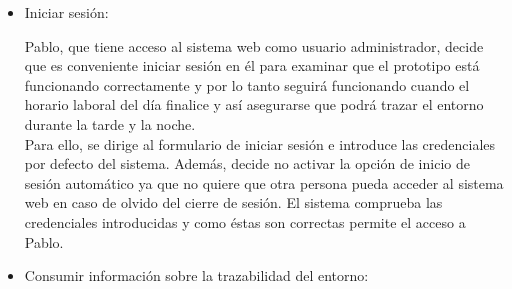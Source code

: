 \documentclass[12pt,a4paper, twoside]{report}
\begin{document}
\begin{itemize}
		Tras haber realizado la configuración inicial, Pablo prepara la localización dentro del CPD donde va a situar el sistema, decidiendo en ese momento cuáles serán los umbrales más idóneos de los eventos a partir de los cuáles los valores medidos se considerarán anómalos y activando así el protocolo de alerta. Antes de realizar la primera prueba, consulta el manual de configuración y de usuario para conocer los servicios de los que debe disponer como, por ejemplo: cuenta en el servicio de almacenamiento en la nube Dropbox, cuenta Gmail, red de negocio desplegada en la \gls{blockchain-a}, etc. \\
		
		En primer lugar, realiza la puesta en marcha y configuración de todos los servicios requeridos y obtiene las direcciones \gls{i2c-a} de los \glspl{lcd-a} las cuales introducirá como opciones en la ejecución. Posteriormente, decide ejecutar el componente de monitorización inicializando los servicios y estableciendo como umbrales límites: 80 $^{\circ}$C de temperatura y 2 metros de distancia. Con estos valores podrá controlar si se produce algún acceso no autorizado durante el horario no laboral al CPD y así intentar resolver ese contratiempo que están sufriendo cada vez más a menudo lo que les provoca una bajada de rendimiento en el ámbito laboral al no funcionar todos los sistemas, caerse la red continuamente, etc.
		
		\item Iniciar sesión:
		
		Pablo, que tiene acceso al sistema web como usuario administrador, decide que es conveniente iniciar sesión en él para examinar que el \gls{prototipo} está funcionando correctamente y por lo tanto seguirá funcionando cuando el horario laboral del día finalice y así asegurarse que podrá trazar el entorno durante la tarde y la noche. \\
		
		Para ello, se dirige al formulario de iniciar sesión e introduce las credenciales por defecto del sistema. Además, decide no activar la opción de inicio de sesión automático ya que no quiere que otra persona pueda acceder al sistema web en caso de olvido del cierre de sesión. El sistema comprueba las credenciales introducidas y como éstas son correctas permite el acceso a Pablo.
		
		\item Consumir información sobre la trazabilidad del entorno: %


\end{itemize}
\end{document}
